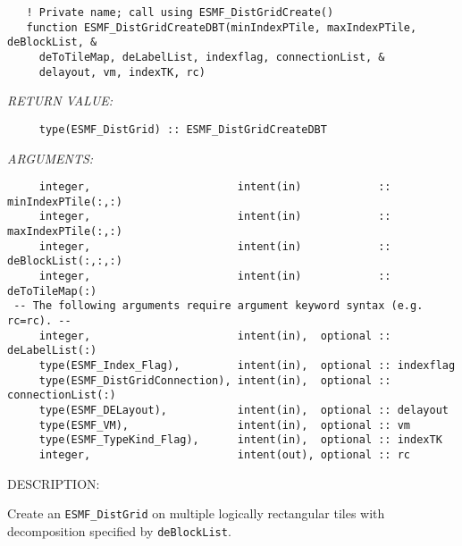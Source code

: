  
\begin{verbatim}   ! Private name; call using ESMF_DistGridCreate()
   function ESMF_DistGridCreateDBT(minIndexPTile, maxIndexPTile, deBlockList, &
     deToTileMap, deLabelList, indexflag, connectionList, &
     delayout, vm, indexTK, rc)
           \end{verbatim}{\em RETURN VALUE:}
\begin{verbatim}     type(ESMF_DistGrid) :: ESMF_DistGridCreateDBT\end{verbatim}{\em ARGUMENTS:}
\begin{verbatim}     integer,                       intent(in)            :: minIndexPTile(:,:)
     integer,                       intent(in)            :: maxIndexPTile(:,:)
     integer,                       intent(in)            :: deBlockList(:,:,:)
     integer,                       intent(in)            :: deToTileMap(:)
 -- The following arguments require argument keyword syntax (e.g. rc=rc). --
     integer,                       intent(in),  optional :: deLabelList(:)
     type(ESMF_Index_Flag),         intent(in),  optional :: indexflag
     type(ESMF_DistGridConnection), intent(in),  optional :: connectionList(:)
     type(ESMF_DELayout),           intent(in),  optional :: delayout
     type(ESMF_VM),                 intent(in),  optional :: vm
     type(ESMF_TypeKind_Flag),      intent(in),  optional :: indexTK
     integer,                       intent(out), optional :: rc\end{verbatim}
{\sf DESCRIPTION:\\ }


       Create an {\tt ESMF\_DistGrid} on multiple logically 
       rectangular tiles with decomposition specified by {\tt deBlockList}.
  
